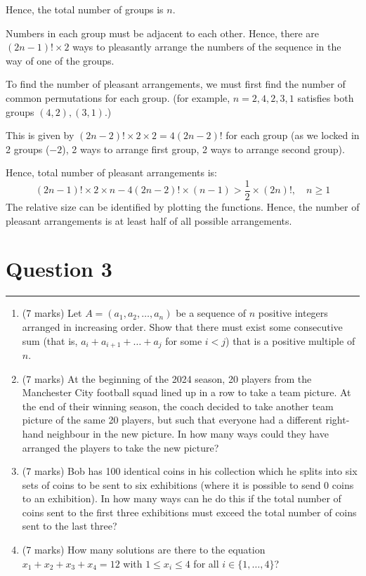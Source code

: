 \documentclass{article}
\begin{document}
\begin{enumerate}[label=(\alph*)]
          Hence, the total number of groups is $n$.

          Numbers in each group must be adjacent to each other. Hence, there are $(2n-1)! \times 2$ ways to pleasantly arrange the numbers of the sequence in the way of one of the groups.

          To find the number of pleasant arrangements, we must first find the number of common permutations for each group. (for example, $n=2, 4,2,3,1$ satisfies both groups $(4,2),(3,1)$.)

          This is given by $(2n-2)!\times2\times2=4(2n-2)!$ for each group (as we locked in 2 groups ($-2$), 2 ways to arrange first group, 2 ways to arrange second group).

          Hence, total number of pleasant arrangements is:
          \[
              (2n-1)! \times 2 \times n - 4(2n-2)! \times (n-1) > \frac{1}{2} \times (2n)!,\quad n \geq 1
          \]
          The relative size can be identified by plotting the functions. Hence, the number of pleasant arrangements is at least half of all possible arrangements.

\end{enumerate}

\newpage
\section*{Question 3}
\hrule
\vspace{0.5cm}

\begin{enumerate}[label=(\alph*)]
    \item (7 marks) Let \( A = (a_1, a_2, \dots, a_n) \) be a sequence of \( n \) positive integers arranged in increasing order. Show that there must exist some consecutive sum (that is, \( a_i + a_{i+1} + \dots + a_j \) for some \( i < j \)) that is a positive multiple of \( n \).

    \item (7 marks) At the beginning of the 2024 season, 20 players from the Manchester City football squad lined up in a row to take a team picture. At the end of their winning season, the coach decided to take another team picture of the same 20 players, but such that everyone had a different right-hand neighbour in the new picture. In how many ways could they have arranged the players to take the new picture?

    \item (7 marks) Bob has 100 identical coins in his collection which he splits into six sets of coins to be sent to six exhibitions (where it is possible to send 0 coins to an exhibition). In how many ways can he do this if the total number of coins sent to the first three exhibitions must exceed the total number of coins sent to the last three?

    \item (7 marks) How many solutions are there to the equation \( x_1 + x_2 + x_3 + x_4 = 12 \) with \( 1 \leq x_i \leq 4 \) for all \( i \in \{1, \dots, 4\} \)?
\end{enumerate}
\end{document}
